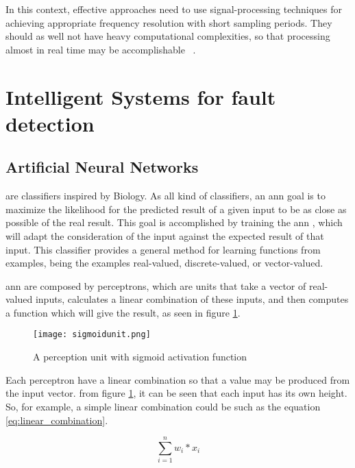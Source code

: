 In this context, effective approaches need to use signal-processing techniques for achieving appropriate frequency resolution with short sampling periods. They should as well not have heavy computational complexities, so that processing almost in real time may be accomplishable ~\cite{Riera-Guasp2015}. 

\section{Intelligent Systems for fault detection} %
\label{sec:machine_learning_approaches}

\subsection{Artificial Neural Networks} %
\label{sec:ann}

 are classifiers inspired by Biology. As all kind of classifiers, an \Acrshort{ann} goal is to maximize the likelihood for the predicted result of a given input to be as close as possible of the real result. This goal is accomplished by training the \Acrshort{ann} , which will adapt the consideration of the input against the expected result of that input. This classifier provides a general method for learning functions from examples, being the examples real-valued, discrete-valued, or vector-valued.

\Acrshort{ann} are composed by perceptrons, which are units that take a vector of real-valued inputs, calculates a linear combination of these inputs, and then computes a function which will give the result, as seen in figure \ref{fig:sigmoid_unit}.

\begin{figure}[htpb]
\centering
\texttt{[image: sigmoidunit.png]}
\caption{A perception unit with sigmoid activation function}
\label{fig:sigmoid_unit}
\end{figure}

Each perceptron have a linear combination so that a value may be produced from the input vector. from figure \ref{fig:sigmoid_unit}, it can be seen that each input has its own height. So, for example, a simple linear combination could be such as the equation \ref{eq:linear_combination}.

\begin{equation} 
\label{eq:linear_combination}
\sum_{i=1}^{n} w_{i}*x_{i}
\end{equation}

